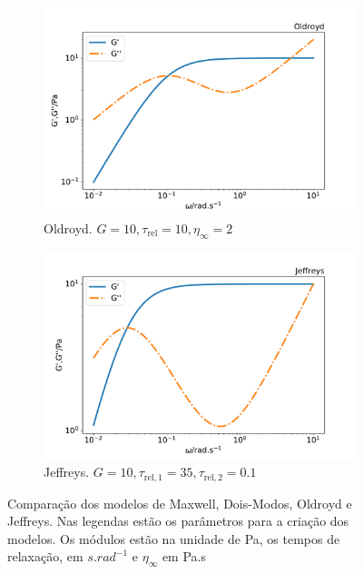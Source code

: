 \begin{figure}[h]
				\begin{subfigure}[t]{.5\textwidth}
					\centering
					\includegraphics[width=\textwidth]{./imagens/reologia/modelos_comparativo_oldroyd}
					\caption{Oldroyd. \(G=10, \tau_{\mathrm{rel}}=10, \eta_{\infty}=2\)}
					\label{fig:comparativo_modelo_oldroyd}
				\end{subfigure}%
				\begin{subfigure}[t]{.5\textwidth}
					\centering
					\includegraphics[width=\textwidth]{./imagens/reologia/modelos_comparativo_jeffreys}
					\caption{Jeffreys. \(G=10, \tau_{\mathrm{rel,1}}=35, \tau_{\mathrm{rel,2}}=0.1 \)}
					\label{fig:comparativo_modelo_jeffreys}
				\end{subfigure}
			
				\caption{Comparação dos modelos de Maxwell, Dois-Modos, Oldroyd e Jeffreys. Nas legendas estão os parâmetros para a criação dos modelos. Os módulos estão na unidade de Pa, os tempos de relaxação, em \(s.rad^{-1}\) e \(\eta_{\infty}\) em Pa.s}
				\label{fig:comparativo_modelos}
			\end{figure}
			
